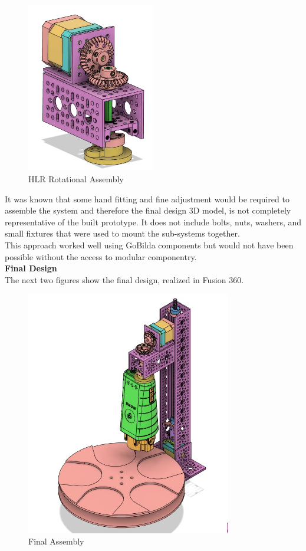 \documentclass{UoNMCHA}
\numberwithin{equation}{section}
\begin{document}
\begin{figure}[H]
	\centering
	\includegraphics[width=0.5\textwidth]{HLR_MOUNT_SUBASSEM.jpg}
	\caption{HLR Rotational Assembly}
	\label{fig:HLR Rotational Assembly}
\end{figure}
It was known that some hand fitting and fine adjustment would be required to assemble the system and therefore the final design 3D model, is not completely representative of the built prototype. It does not include bolts, nuts, washers, and small fixtures that were used to mount the sub-systems together.\\
This approach worked well using GoBilda components but would not have been possible without the access to modular componentry.\\
\textbf{Final Design}\\
The next two figures show the final design, realized in Fusion 360.\\
\begin{figure}[H]
	\centering
	\includegraphics[width=0.8\textwidth]{FINAL_ASSEM_ISO.jpg}
	\caption{Final Assembly}
	\label{fig:Final Assembly}
\end{figure}
\end{document}
